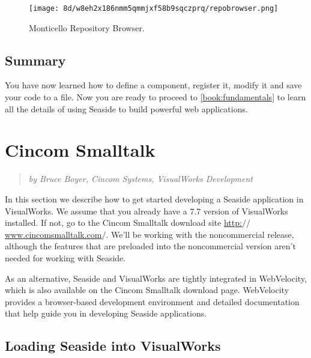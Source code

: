 \documentclass[a4paper,10pt,twoside]{book}
\newenvironment{blockquote}%
	{\begin{quote}}
	{\end{quote}}
\begin{document}
\begin{figure}[h!tbp]
	\begin{center}
		\texttt{[image: 8d/w8eh2x186nmm5qmmjxf58b9sqczprq/repobrowser.png]}
		\caption{Monticello Repository Browser.\label{book:gettingstarted:pharo:monticello:mcrepo}}
	\end{center}
\end{figure}


\section{Summary}
\label{book:gettingstarted:pharo:summary}

You have now learned how to define a component, register it, modify it and save your code to a file. Now you are ready to proceed to \autoref{book:fundamentals} to learn all the details of using Seaside to build powerful web applications.

\chapter{Cincom Smalltalk}
\label{book:gettingstarted:cincomsmalltalk}

\begin{blockquote}
\textit{by Bruce Boyer, Cincom Systems, VisualWorks Development}

\end{blockquote}

In this section we describe how to get started developing a Seaside application in VisualWorks. We assume that you already have a 7.7 version of VisualWorks installed. If not, go to the Cincom Smalltalk download site \href{http://www.cincomsmalltalk.com/}{http:$/$$/$www.cincomsmalltalk.com$/$}. We'll be working with the noncommercial release, although the features that are preloaded into the noncommercial version aren't needed for working with Seaside.

As an alternative, Seaside and VisualWorks are tightly integrated in WebVelocity, which is also available on the Cincom Smalltalk download page. WebVelocity provides a browser-based development environment and detailed documentation that help guide you in developing Seaside applications. 

\section{Loading Seaside into VisualWorks}
\label{book:gettingstarted:cincomsmalltalk:loading}
\end{document}
